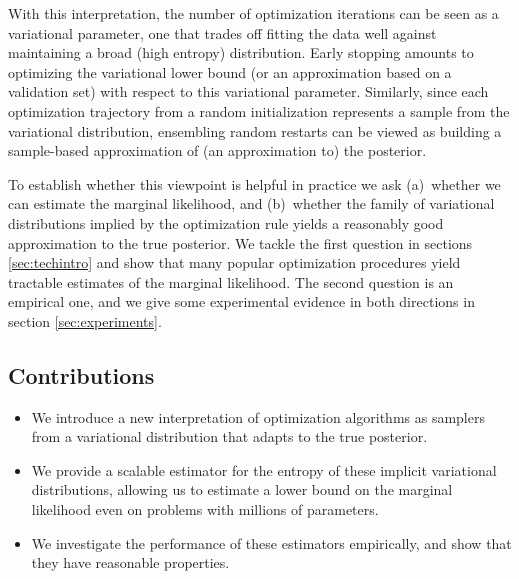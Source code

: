 \documentclass[]{article}
\begin{document}
With this interpretation, the number of optimization iterations can be seen as a variational parameter, one that trades off fitting the data well against maintaining a broad (high entropy) distribution.
Early stopping amounts to optimizing the variational lower bound (or an approximation based on a validation set) with respect to this variational parameter.
Similarly, since each optimization trajectory from a random initialization represents a sample from the variational distribution, ensembling random restarts can be viewed as building a sample-based approximation of (an approximation to) the posterior.

To establish whether this viewpoint is helpful in practice we ask (a)~whether we can estimate the marginal likelihood, and (b)~whether the family of variational distributions implied by the optimization rule yields a reasonably good approximation to the true posterior.
We tackle the first question in sections \ref{sec:techintro} and show that many popular optimization procedures yield tractable estimates of the marginal likelihood.
The second question is an empirical one, and we give some experimental evidence in both directions in section \ref{sec:experiments}.

\subsection{Contributions}
\begin{itemize}
\item We introduce a new interpretation of optimization algorithms as samplers from a variational distribution that adapts to the true posterior.
\item We provide a scalable estimator for the entropy of these implicit variational distributions, allowing us to estimate a lower bound on the marginal likelihood even on problems with millions of parameters.
\item We investigate the performance of these estimators empirically, and show that they have reasonable properties.
\end{itemize}
\end{document}

